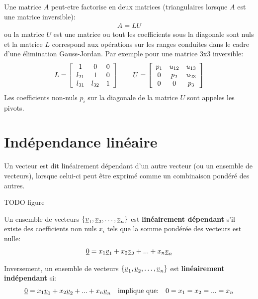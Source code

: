 Une matrice $A$ peut-etre factorise en deux matrices (triangulaires lorsque $A$ est une matrice inversible):
%
\begin{align}
A = LU 
\end{align}
%
ou la matrice $U$ est une matrice ou tout les coefficients sous la diagonale sont nuls et la matrice $L$ correspond aux opérations sur les ranges conduites dans le cadre d'une élimination Gauss-Jordan. Par exemple pour une matrice 3x3 inversible:
%
\begin{align}
L= 
\left[ \begin{array}{c c c } 
1      &   0       & 0   \\ 
l_{21} &   1       & 0   \\  
l_{31} & l_{32}    & 1
\end{array} \right]
\quad\quad
U = 
\left[ \begin{array}{c c c c c } 
p_{1} & u_{12} &  u_{13} \\ 
0     & p_{2}  &  u_{23}  \\ 
0     & 0      &  p_{3}
\end{array} \right]
\end{align}
%
Les coefficients non-nuls $p_i$ sur la diagonale de la matrice $U$ sont appeles les pivots.

\section{Indépendance linéaire}
\label{sec:lindep}

Un vecteur est dit linéairement dépendant d'un autre vecteur (ou un ensemble de vecteurs), lorsque celui-ci peut être exprimé comme un combinaison pondéré des autres. 

TODO figure

Un ensemble de vecteurs $\left\{ \underline{v}_1, \underline{v}_2, \hdots, \underline{v}_n \right\}$ est \textbf{linéairement dépendant} s'il existe des coefficients non nuls $x_i$ tels que la somme pondérée des vecteurs est nulle:
\begin{align}
\underline{0} = x_1 \underline{v}_1 + x_2 \underline{v}_2 + ... + x_n \underline{v}_n
\end{align}

Inversement, un ensemble de vecteurs $\left\{ \underline{v}_1, \underline{v}_2, \hdots, \underline{v}_n \right\}$ est \textbf{linéairement indépendant} si:
\begin{align}
\underline{0} = x_1 \underline{v}_1 + x_2 \underline{v}_2 + ... + x_n \underline{v}_n
\quad
\text{implique que:}
\quad
0 = x_1 = x_2 = ... = x_n 
\end{align}

